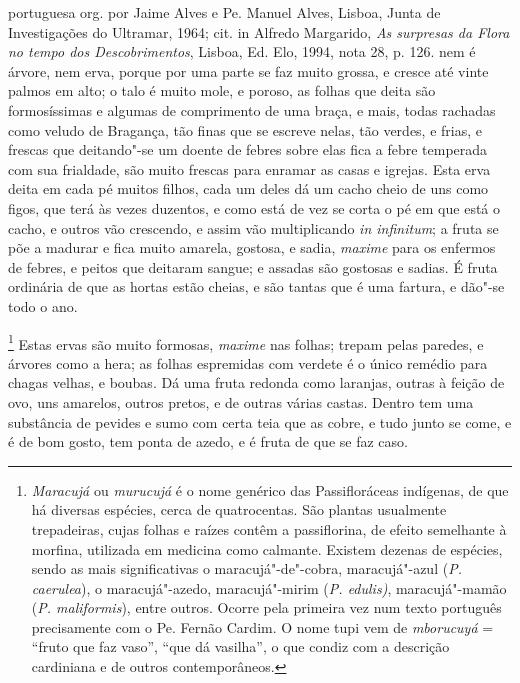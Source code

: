 \begin{linenumbers}
{portuguesa org. por Jaime Alves e Pe. Manuel Alves, Lisboa, Junta de
Investigações do Ultramar, 1964; cit. in Alfredo Margarido, \textit{As
surpresas da Flora no tempo dos Descobrimentos}, Lisboa, Ed. Elo, 1994,
nota 28, p. 126.} nem é árvore, nem erva, porque por uma
parte se faz muito grossa, e cresce até vinte palmos em alto; o talo é
muito mole, e poroso, as folhas que deita são formosíssimas e algumas
de comprimento de uma braça, e mais, todas rachadas como veludo de
Bragança, tão finas que se escreve nelas, tão verdes, e frias, e
frescas que deitando"-se um doente de febres sobre elas fica a febre
temperada com sua frialdade, são muito frescas para enramar as casas e
igrejas. Esta erva deita em cada pé muitos filhos, cada um deles dá um
cacho cheio de uns como figos, que terá às vezes duzentos, e como está
de vez se corta o pé em que está o cacho, e outros vão crescendo, e
assim vão multiplicando \textit{in infinitum}; a fruta se põe a madurar e fica
muito amarela, gostosa, e sadia, \textit{maxime} para os enfermos de febres, e
peitos que deitaram sangue; e assadas são gostosas e sadias. É fruta
ordinária de que as hortas estão cheias, e são tantas que é uma
fartura, e dão"-se todo o ano.

\footnote{ \textit{Maracujá} ou \textit{murucujá} 
é o nome genérico das Passifloráceas indígenas, de que há diversas
espécies, cerca de quatrocentas. São plantas usualmente trepadeiras,
cujas folhas e raízes contêm a passiflorina, de efeito semelhante à
morfina, utilizada em medicina como calmante. Existem dezenas de
espécies, sendo as mais significativas o maracujá"-de"-cobra,
maracujá"-azul (\textit{P. caerulea}), o maracujá"-azedo, maracujá"-mirim
(\textit{P. edulis)}, maracujá"-mamão (\textit{P. maliformis}), entre
outros. Ocorre pela primeira vez num texto português precisamente com o
Pe. Fernão Cardim. O nome tupi vem de \textit{mborucuyá} = ``fruto que
faz vaso'', ``que dá vasilha'', o que condiz com a descrição cardiniana e
de outros contemporâneos.} Estas ervas são muito formosas,
\textit{maxime} nas folhas; trepam pelas paredes, e árvores como a hera; as
folhas espremidas com verdete é o único remédio para chagas velhas, e
boubas. Dá uma fruta redonda como laranjas, outras à feição de ovo, uns
amarelos, outros pretos, e de outras várias castas. Dentro tem uma
substância de pevides e sumo com certa teia que as cobre, e tudo junto
se come, e é de bom gosto, tem ponta de azedo, e é fruta de que se faz caso.


\end{linenumbers}
